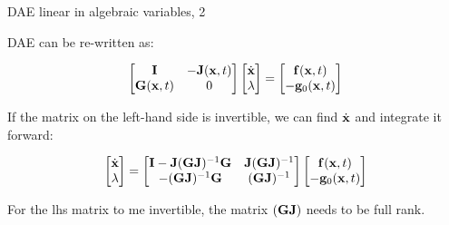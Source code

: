 \documentclass{beamer}
\begin{document}
\begin{frame}{DAE linear in algebraic variables, 2}
	\begin{flushleft}
		
		DAE can be re-written as:
		
		\begin{equation}
			\begin{bmatrix}
				\mathbf{I} & -\mathbf{J}(\mathbf{x}, t) \\
				\mathbf{G}(\mathbf{x}, t) & 0
			\end{bmatrix}
		\begin{bmatrix}
			\dot{\mathbf{x}} \\ \lambda
		\end{bmatrix}
		=
		\begin{bmatrix}
			\mathbf{f}(\mathbf{x}, t) \\
			-\mathbf{g}_0(\mathbf{x}, t)
		\end{bmatrix}
		\end{equation}
		
		If the matrix on the left-hand side is invertible, we can find $\dot{\mathbf{x}}$ and integrate it forward:
		
		\begin{equation}
			\begin{bmatrix}
				\dot{\mathbf{x}} \\ \lambda
			\end{bmatrix}
		=
		\begin{bmatrix}
			\mathbf{I} - \mathbf{J}(\mathbf{G}\mathbf{J})^{-1}\mathbf{G}
			& 
			\mathbf{J}(\mathbf{G}\mathbf{J})^{-1}
			\\
			-(\mathbf{G}\mathbf{J})^{-1}\mathbf{G}
			& 
			(\mathbf{G}\mathbf{J})^{-1}
		\end{bmatrix}
			\begin{bmatrix}
				\mathbf{f}(\mathbf{x}, t) \\
				-\mathbf{g}_0(\mathbf{x}, t)
			\end{bmatrix}
		\end{equation}
		
		For the lhs matrix to me invertible, the matrix $(\mathbf{G}\mathbf{J})$ needs to be full rank.
		
	\end{flushleft}
\end{frame}
\end{document}
